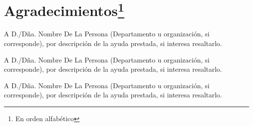 %
%

\chapter*{Agradecimientos\footnote{En orden alfabético}}

A D./Dña. Nombre De La Persona (Departamento u organización, si corresponde), por descripción de la ayuda prestada, si interesa resaltarlo.

A D./Dña. Nombre De La Persona (Departamento u organización, si corresponde), por descripción de la ayuda prestada, si interesa resaltarlo.

A D./Dña. Nombre De La Persona (Departamento u organización, si corresponde), por descripción de la ayuda prestada, si interesa resaltarlo.



